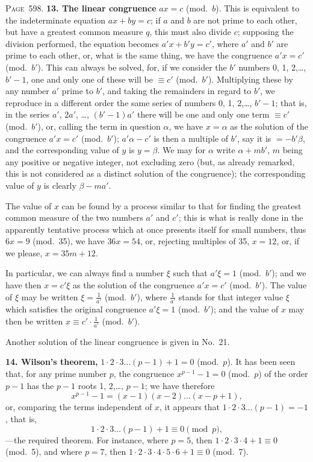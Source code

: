 \documentclass[11pt,a4paper]{book}
\begin{document}
\newpage
\noindent\textsc{Page~598.} \textbf{13. The linear congruence} $ax=c$ (mod.\ $b$). This is equivalent to the indeterminate equation $ax+by=c$; if $a$ and $b$ are not prime to each other, but have a greatest common measure $q$, this must also divide $c$; supposing the division performed, the equation becomes $a'x+b'y=c'$, where $a'$ and $b'$ are prime to each other, or, what is the same thing, we have the congruence $a'x=c'$ (mod.\ $b'$). This can always be solved, for, if we consider the $b'$ numbers 0, 1, 2,\ldots, $b'-1$, one and only one of these will be $\equiv c'$ (mod.\ $b'$). Multiplying these by any number $a'$ prime to $b'$, and taking the remainders in regard to $b'$, we reproduce in a different order the same series of numbers 0, 1, 2,\ldots, $b'-1$; that is, in the series $a'$, $2a'$, \ldots, $(b'-1)a'$ there will be one and only one term $\equiv c'$ (mod.\ $b'$), or, calling the term in question $\alpha$, we have $x=\alpha$ as the solution of the congruence $a'x=c'$ (mod.\ $b'$); $a'\alpha-c'$ is then a multiple of $b'$, say it is $=-b'\beta$, and the corresponding value of $y$ is $y=\beta$. We may for $\alpha$ write $\alpha+mb'$, $m$ being any positive or negative integer, not excluding zero (but, as already remarked, this is not considered as a distinct solution of the congruence); the corresponding value of $y$ is clearly $\beta-ma'$.

The value of $x$ can be found by a process similar to that for finding the greatest common measure of the two numbers $a'$ and $c'$; this is what is really done in the apparently tentative process which at once presents itself for small numbers, thus $6x=9$ (mod.\ 35), we have $36x=54$, or, rejecting multiples of 35, $x=12$, or, if we please, $x=35m+12$.

In particular, we can always find a number $\xi$ such that $a'\xi=1$ (mod.\ $b'$); and we have then $x=c'\xi$ as the solution of the congruence $a'x=c'$ (mod.\ $b'$). The value of $\xi$ may be written $\xi=\frac{1}{a'}$ (mod.\ $b'$), where $\frac{1}{a'}$ stands for that integer value $\xi$ which satisfies the original congruence $a'\xi=1$ (mod.\ $b'$); and the value of $x$ may then be written $x\equiv c'\cdot\frac{1}{a'}$ (mod.\ $b'$).

Another solution of the linear congruence is given in No.~21.

\textbf{14. Wilson's theorem,} $1\cdot2\cdot3\ldots(p-1)+1=0$ (mod.\ $p$). It has been seen that, for any prime number $p$, the congruence $x^{p-1}-1=0$ (mod.\ $p$) of the order $p-1$ has the $p-1$ roots 1, 2,\ldots, $p-1$; we have therefore
\[
x^{p-1}-1=(x-1)(x-2)\ldots(x-p+1),
\]
or, comparing the terms independent of $x$, it appears that $1\cdot2\cdot3\ldots(p-1)=-1$, that is,
\[
1\cdot2\cdot3\ldots(p-1)+1\equiv0\pmod{p},
\]
---the required theorem. For instance, where $p=5$, then $1\cdot2\cdot3\cdot4+1\equiv0$ (mod.\ 5), and where $p=7$, then $1\cdot2\cdot3\cdot4\cdot5\cdot6+1\equiv0$ (mod.\ 7).
\end{document}
